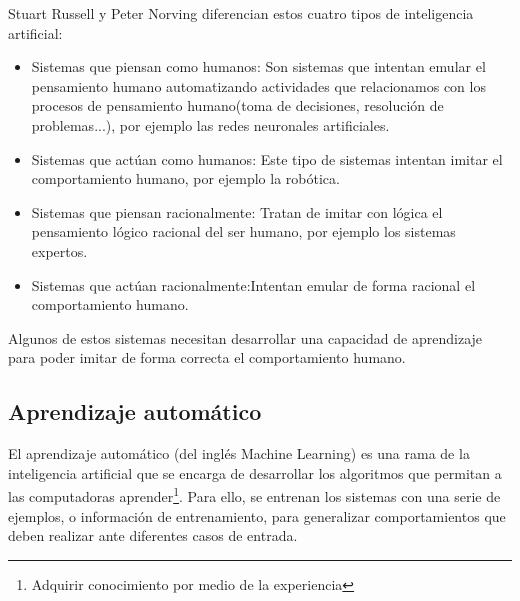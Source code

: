Stuart Russell y Peter Norving diferencian estos cuatro tipos de inteligencia artificial:

\begin{itemize}
	\item{Sistemas que piensan como humanos}: Son sistemas que intentan emular el pensamiento humano automatizando actividades que relacionamos con los procesos de pensamiento humano(toma de decisiones, resolución de problemas...), por ejemplo las redes neuronales artificiales.
	\item{Sistemas que actúan como humanos}: Este tipo de sistemas intentan imitar el comportamiento humano, por ejemplo la robótica.
	\item{Sistemas que piensan racionalmente}: Tratan de imitar con lógica el pensamiento lógico racional del ser humano, por ejemplo los sistemas expertos.
	\item{Sistemas que actúan racionalmente}:Intentan emular de forma racional el comportamiento humano.
\end{itemize}\cite{wiki:tiposInteligenciaArtificial}

Algunos de estos sistemas necesitan desarrollar una capacidad de aprendizaje para poder imitar de forma correcta el comportamiento humano.

\subsection{Aprendizaje automático}

El aprendizaje automático (del inglés Machine Learning) es una rama de la inteligencia artificial que se encarga de desarrollar los algoritmos que permitan a las computadoras aprender\footnote{Adquirir conocimiento por medio de la experiencia}. Para ello, se entrenan los sistemas con una serie de ejemplos, o información de entrenamiento, para generalizar comportamientos que deben realizar ante diferentes casos de entrada.

